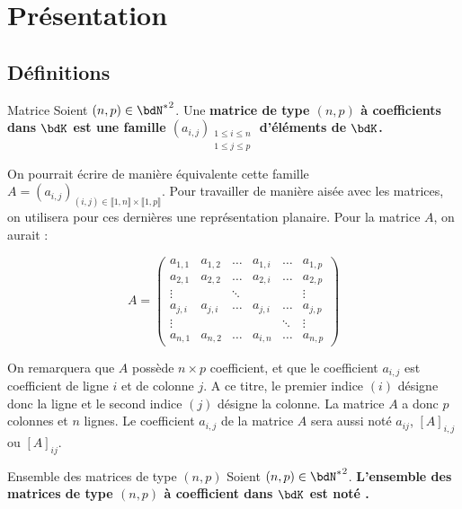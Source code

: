\documentclass[a4paper,french,bookmarks]{article}
\begin{document}

\initcours{}

\section{Présentation}

\subsection{Définitions}

\begin{definition}{Matrice}{}
    Soient $(n, p) \in {\bdN^*}^2$. Une \bf{matrice de type $(n, p)$} à coefficients dans $\bdK$ est une famille $(a_{i, j})_{\substack{1 \leq i \leq n\\1 \leq j \leq p}}$ d'éléments de $\bdK$.
\end{definition}
On pourrait écrire de manière équivalente cette famille $A = (a_{i,j})_{(i, j) \in \llbracket 1, n\rrbracket \times \llbracket 1, p\rrbracket}$. Pour travailler de manière aisée avec les matrices, on utilisera pour ces dernières une représentation planaire. Pour la matrice $A$, on aurait :

\[ A = \begin{pmatrix}
a_{1,1} & a_{1,2} & \dots & a_{1,i} & \dots & a_{1,p}\\
a_{2,1} & a_{2,2} & \dots & a_{2, i} & \dots & a_{2,p}\\
\vdots & & \ddots& & & \vdots\\
a_{j, i} & a_{j, i} & \dots & a_{j, i} & \dots &a_{j, p}\\
\vdots & & & & \ddots & \vdots\\
a_{n, 1} & a_{n, 2} & \dots & a_{i, n} &\dots &a_{n, p}
\end{pmatrix}\]

On remarquera que $A$ possède $n \times p$ coefficient, et que le coefficient $a_{i, j}$ est coefficient de ligne $i$ et de colonne $j$. A ce titre, le premier indice $(i)$ désigne donc la ligne et le second indice $(j)$ désigne la colonne. La matrice $A$ a donc $p$ colonnes et $n$ lignes. Le coefficient $a_{i, j}$ de la matrice $A$ sera aussi noté $a_{ij}$, $[A]_{i, j}$ ou $[A]_{ij}$.

\begin{definition}{Ensemble des matrices de type $(n, p)$}{}
    Soient $(n, p) \in {\bdN^*}^2$. \bf{L'ensemble des matrices de type $(n, p)$} à coefficient dans $\bdK$ est noté .
\end{definition}
\end{document}
